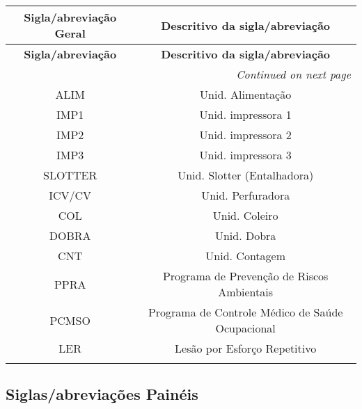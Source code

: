 \begin{longtable}{@{}c c@{}}
\textbf{Sigla/abreviação Geral} & \textbf{Descritivo da sigla/abreviação} \\
\midrule
\endfirsthead
\textbf{Sigla/abreviação} & \textbf{Descritivo da sigla/abreviação} \\
\midrule
\endhead
\midrule
\multicolumn{2}{r}{\textit{Continued on next page}}
\endfoot
\midrule
\endlastfoot

\gls{alm} & Alarme \\
\addlinespace[0.2cm]

\gls{ALIM} & Unid. Alimentação  \\
\addlinespace[0.2cm]

\gls{IMP1} & Unid. impressora 1 \\
\addlinespace[0.2cm]

\gls{IMP2} & Unid. impressora 2 \\
\addlinespace[0.2cm]

\gls{IMP3} & Unid. impressora 3 \\
\addlinespace[0.2cm]

\gls{SLOTTER} & Unid. Slotter (Entalhadora) \\
\addlinespace[0.2cm]

\gls{ICV/CV} & Unid. Perfuradora \\
\addlinespace[0.2cm]

\gls{COL} & Unid. Coleiro \\
\addlinespace[0.2cm]

\gls{DOBRA} & Unid. Dobra \\
\addlinespace[0.2cm]

\gls{CNT} & Unid. Contagem \\
\addlinespace[0.2cm]

\gls{PPRA} & Programa de Prevenção de Riscos Ambientais \\
\addlinespace[0.2cm]

\gls{PCMSO} & Programa de Controle Médico de Saúde Ocupacional \\
\addlinespace[0.2cm]

\gls{LER} & Lesão por Esforço Repetitivo \\
\addlinespace[0.2cm]

\end{longtable}

\newpage
\thispagestyle{fancy}
\vspace*{40 pt}

\subsection{Siglas/abreviações Painéis}



